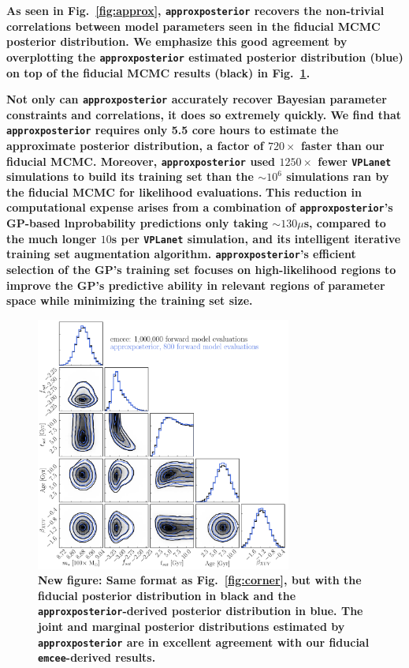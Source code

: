 \documentclass[twocolumn]{aastex62}
\newcommand{\xxx}[1]{{\textbf{#1}}}
\newcommand{\vplanet}[0]{\texttt{VPLanet}\xspace}
\newcommand{\emcee}[0]{\texttt{emcee}\xspace}
\newcommand{\approxposterior}[0]{\texttt{approxposterior}\xspace}
\begin{document}
\xxx{As seen in Fig.~\ref{fig:approx}, \approxposterior recovers the non-trivial correlations between model parameters seen in the fiducial MCMC posterior distribution. We emphasize this good agreement by overplotting the \approxposterior estimated posterior distribution (blue) on top of the fiducial MCMC results (black) in Fig.~\ref{fig:stacked}.}

\xxx{Not only can \approxposterior accurately recover Bayesian parameter constraints and correlations, it does so extremely quickly. We find that \approxposterior requires only 5.5 core hours to estimate the approximate posterior distribution, a factor of $720\times$ faster than our fiducial MCMC. Moreover, \approxposterior used $1250\times$ fewer \vplanet simulations to build its training set than the ${\sim}10^6$ simulations ran by the fiducial MCMC for likelihood evaluations.} \xxx{This reduction in computational expense arises from a combination of \approxposterior's GP-based lnprobability predictions only taking ${\sim}130\mu$s, compared to the much longer $10$s per \vplanet simulation, and its intelligent iterative training set augmentation algorithm. \approxposterior's efficient selection of the GP's training set focuses on high-likelihood regions to improve the GP's predictive ability in relevant regions of parameter space while minimizing the training set size.}

\begin{figure}
\centering
	\includegraphics[width=0.75\textwidth]{../Analysis/Approx/stacked.pdf}
   \caption{\xxx{New figure: Same format as Fig.~\ref{fig:corner}, but with the fiducial posterior distribution in black and the \approxposterior-derived posterior distribution in blue. \textbf{The joint and marginal posterior distributions estimated by \approxposterior are in excellent agreement with our fiducial \emcee-derived results.}}}%
    \label{fig:stacked}%
\end{figure}
\end{document}

